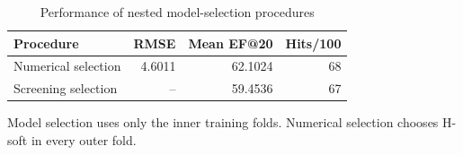 \par
\begin{table}[H]
\centering
\begin{threeparttable}
\caption{Performance of nested model-selection procedures}\label{tab:nested}
\begin{tabular}{@{}lrrr@{}}
\toprule
Procedure & RMSE & Mean EF@20 & Hits/100\\
\midrule
Numerical selection & 4.6011 & 62.1024 & 68\\
Screening selection & -- & 59.4536 & 67\\
\bottomrule
\end{tabular}
\begin{tablenotes}[flushleft]
\item[] Model selection uses only the inner training folds. Numerical selection chooses H-soft in every outer fold.
\end{tablenotes}
\end{threeparttable}
\end{table}
\par
